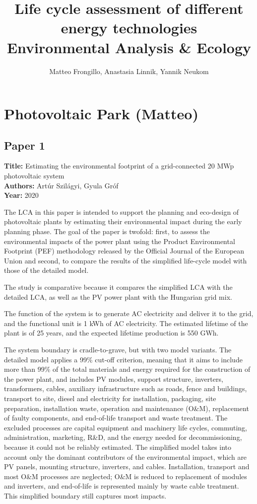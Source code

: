 \documentclass[9pt]{extarticle}
\title{\textbf{Life cycle assessment of different energy technologies \\ \Large Environmental Analysis \& Ecology}}
\author{Matteo Frongillo, Anastasia Linnik, Yannik Neukom}
\date{}
\begin{document}
\maketitle
\thispagestyle{fancy}
\vspace{-2em}

\section{Photovoltaic Park {\small (Matteo)}}
\subsection{Paper 1 \parencite{SZILAGYI2020491}}
\textbf{Title:} Estimating the environmental footprint of a grid-connected 20 MWp photovoltaic system\\
\textbf{Authors:} Artúr Szilágyi, Gyula Gróf\\
\textbf{Year:} 2020

The LCA in this paper is intended to support the planning and eco-design of photovoltaic
plants by estimating their environmental impact during the early planning phase. 
The goal of the paper is twofold: first, to assess the environmental impacts of the power
plant using the Product Environmental Footprint (PEF) methodology released by the Official
Journal of the European Union \parencite{EuropeanCommission2013Recommendation179} and second,
to compare the results of the simplified life-cycle model with those of the detailed model.

The study is comparative because it compares the simplified LCA with the detailed LCA, as
well as the PV power plant with the Hungarian grid mix.

The function of the system is to generate AC electricity and deliver it to the grid,
and the functional unit is 1 kWh of AC electricity. The estimated lifetime of the plant
is of 25 years, and the expected lifetime production is 550 GWh.

The system boundary is cradle-to-grave, but with two model variants. The detailed model
applies a 99\% cut-off criterion, meaning that it aims to include more than 99\% of the
total materials and energy required for the construction of the power plant, and
includes PV modules, support structure, inverters, transformers,
cables, auxiliary infrastructure such as roads, fence and buildings, transport to site,
diesel and electricity for installation, packaging, site preparation, installation
waste, operation and maintenance (O\&M), replacement of faulty components,
and end-of-life transport and waste treatment. The excluded processes are capital
equipment and machinery life cycles, commuting, administration, marketing, R\&D, and the
energy needed for decommissioning, because it could not be reliably estimated.
The simplified model takes into account only the dominant contributors of the
environmental impact, which are PV panels, mounting structure, inverters, and cables.
Installation, transport and most O\&M processes are neglected; O\&M is reduced to
replacement of modules and inverters, and end-of-life is represented mainly by waste
cable treatment. This simplified boundary still captures most impacts.
\end{document}
